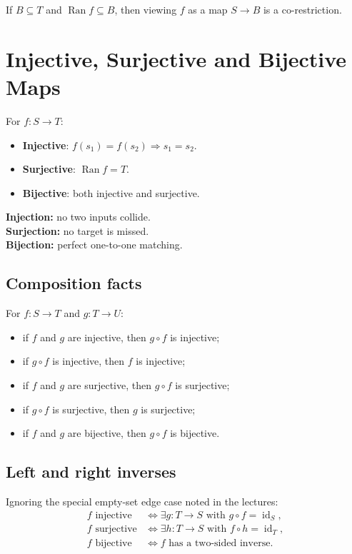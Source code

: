 \documentclass[11pt,a4paper]{article}
\newcommand{\Ran}{\operatorname{Ran}}
\newcommand{\id}{\operatorname{id}}
\begin{document}
If $B\subseteq T$ and $\Ran f\subseteq B$, then viewing $f$ as a map $S\to B$ is a co-restriction.

\section{Injective, Surjective and Bijective Maps}

\begin{defbox}
For $f:S\to T$:
\begin{itemize}
\item \textbf{Injective}: $f(s_1)=f(s_2)\Rightarrow s_1=s_2$.
\item \textbf{Surjective}: $\Ran f=T$.
\item \textbf{Bijective}: both injective and surjective.
\end{itemize}
\end{defbox}

\begin{keybox}
\textbf{Injection:} no two inputs collide.\\
\textbf{Surjection:} no target is missed.\\
\textbf{Bijection:} perfect one-to-one matching.
\end{keybox}

\subsection{Composition facts}
For $f:S\to T$ and $g:T\to U$:
\begin{itemize}
\item if $f$ and $g$ are injective, then $g\circ f$ is injective;
\item if $g\circ f$ is injective, then $f$ is injective;
\item if $f$ and $g$ are surjective, then $g\circ f$ is surjective;
\item if $g\circ f$ is surjective, then $g$ is surjective;
\item if $f$ and $g$ are bijective, then $g\circ f$ is bijective.
\end{itemize}

\subsection{Left and right inverses}
\begin{theorembox}
Ignoring the special empty-set edge case noted in the lectures:
\begin{align*}
f\text{ injective} &\iff \exists g:T\to S\text{ with }g\circ f=\id_S,\\
f\text{ surjective} &\iff \exists h:T\to S\text{ with }f\circ h=\id_T,\\
f\text{ bijective} &\iff f\text{ has a two-sided inverse}.
\end{align*}
\end{theorembox}
\end{document}
